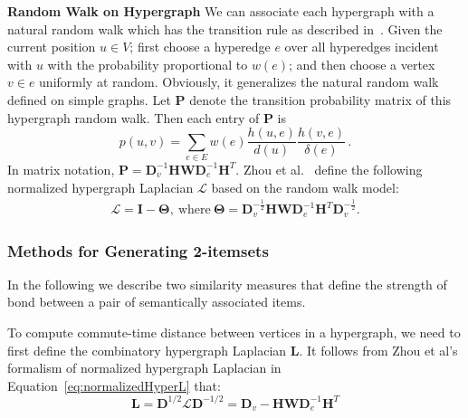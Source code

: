 \textbf{Random Walk on Hypergraph}
\label{sec:rw_hyper}
We can associate each hypergraph with a natural random walk which has the transition rule as
described in~\cite{Zhou06learningwith}. Given the current position $u \in V$; first choose a hyperedge $e$ over all hyperedges
incident with $u$ with the probability proportional to $w(e)$; and then choose a vertex $v \in e$
uniformly at random. Obviously, it generalizes the natural random walk defined on simple
graphs. Let $\mathbf{P}$ denote the transition probability matrix of this hypergraph random walk.
Then each entry of $\mathbf{P}$ is
\[
p(u,v) = \sum_{e\in E}{w(e)\frac{h(u,e)}{d(u)}\frac{h(v,e)}{\delta(e)}}\, .
\]
In matrix notation, $\mathbf{P}=\mathbf{D}_v^{-1}\mathbf{HWD}_e^{-1}\mathbf{H}^T$.
Zhou et al.~\cite{Zhou06learningwith} define the following normalized hypergraph Laplacian $\mathcal{L}$ based on the random walk model:
\begin{align}
\mathcal{L}=\mathbf{I}-\mathbf{\Theta},   ~\mathrm{where}~ \mathbf{\Theta}=\mathbf{D}_v^{-\frac12}\mathbf{HWD}_e^{-1}\mathbf{H}^T\mathbf{D}_v^{-\frac12} \label{eq:normalizedHyperL}.
\end{align}

\subsubsection{Methods for Generating 2-itemsets}
In the following we describe two similarity measures that define the strength of bond between a pair of semantically associated items.

To compute commute-time distance between vertices in a hypergraph, we need to first define the combinatory hypergraph Laplacian $\mathbf{L}$.
It follows from Zhou et al's formalism of normalized hypergraph Laplacian in Equation~\ref{eq:normalizedHyperL} that:
\begin{equation}
\mathbf{L}=\mathbf{D}^{1/2}\mathcal{L}\mathbf{D}^{-1/2}=\mathbf{D}_v-\mathbf{HWD}_e^{-1}\mathbf{H}^T \label{eq:combinatoryHyperL}
\end{equation}


